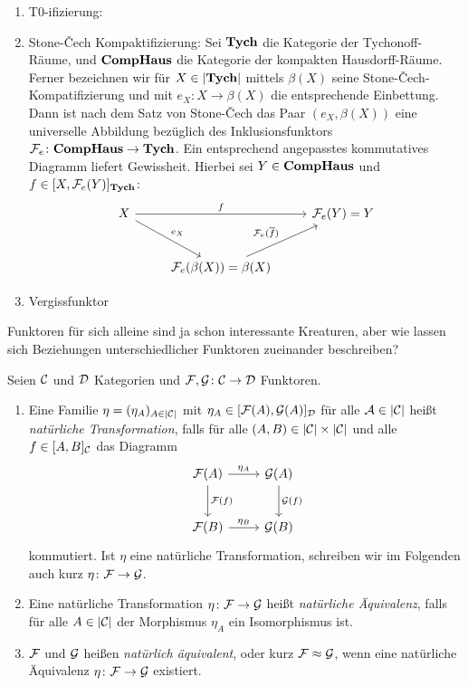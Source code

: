 \begin{ex}
  \begin{enumerate}
    \item T0-ifizierung: 
    \item Stone-\v{C}ech Kompaktifizierung: Sei $\mathbf{Tych}$ die Kategorie der Tychonoff-Räume, und $\mathbf{CompHaus}$ die Kategorie der kompakten Hausdorff-Räume.
      Ferner bezeichnen wir für $X \in |\mathbf{Tych}|$ mittels $\beta(X)$ seine Stone-\v{C}ech-Kompatifizierung und mit $e_X \colon X \to \beta(X)$ die entsprechende Einbettung. Dann ist nach dem Satz von Stone-\v{C}ech \cite[5.4.8]{bartsch} das Paar $(e_X, \beta(X))$ eine universelle Abbildung bezüglich des Inklusionsfunktors $\mathcal{F}_e \colon \mathbf{CompHaus} \to \mathbf{Tych}$.
      Ein entsprechend angepasstes kommutatives Diagramm liefert Gewissheit. Hierbei sei $Y \in \mathbf{CompHaus}$ und $f \in [X, \mathcal{F}_e(Y)]_{\mathbf{Tych}}$:
      $$
      \begin{tikzcd}[row sep=2.5em]
        X \arrow[rd,"e_X"] \arrow[rr, "f"] &&\F_e(Y) = Y \\
        &\F_e(\beta(X)) = \beta(X) \arrow[ru, "\F_e(\overline{f})"]
      \end{tikzcd}
      $$
    \item Vergissfunktor
  \end{enumerate}
\end{ex}

Funktoren für sich alleine sind ja schon interessante Kreaturen, aber wie lassen sich Beziehungen unterschiedlicher Funktoren zueinander beschreiben?

\begin{defn}
  Seien $\mathcal{C}$ und $\mathcal{D}$ Kategorien und $\mathcal{F}, \mathcal{G} \colon \mathcal{C} \to \mathcal{D}$ Funktoren.
  \begin{enumerate}[1)]
    \item Eine Familie $\eta = (\eta_A)_{A \in |\mathcal{C}|}$ mit $\eta_A \in [\mathcal{F}(A), \mathcal{G}(A)]_{\mathcal{D}}$ für alle $\mathcal{A} \in |\mathcal{C}|$ heißt \emph{natürliche Transformation}, falls für alle $(A,B) \in |\mathcal{C}| \times |\mathcal{C}|$ und alle $f \in [A,B]_{\mathcal{C}}$ das Diagramm
      $$
      \begin{tikzcd}[row sep=2.5em]
        \F(A)\arrow[r,"\eta_A"]\arrow[d,"\F(f)"] & \G(A)\arrow[d,"\G(f)"] \\
        \F(B)\arrow[r,"\eta_B"] & \G(B)
      \end{tikzcd}
      $$
      kommutiert. Ist $\eta$ eine natürliche Transformation, schreiben wir im Folgenden auch kurz $\eta \colon \mathcal{F} \to \mathcal{G}$.
    \item Eine natürliche Transformation $\eta \colon \mathcal{F} \to \mathcal{G}$ heißt \emph{natürliche Äquivalenz}, falls für alle $A \in |\mathcal{C}|$ der Morphismus $\eta_A$ ein Isomorphismus ist.
    \item $\mathcal{F}$ und $\mathcal{G}$ heißen \emph{natürlich äquivalent}, oder kurz $\mathcal{F} \approx \mathcal{G}$, wenn eine natürliche Äquivalenz $\eta \colon \mathcal{F} \to \mathcal{G}$ existiert.
  \end{enumerate}
\end{defn}

